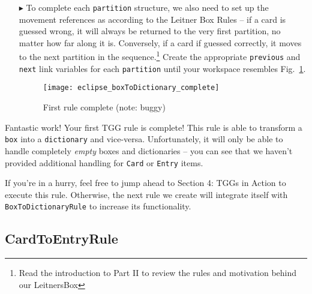\begin{itemize}
\item[$\blacktriangleright$] To complete each \texttt{partition} structure, we also need to set up the movement references as according to the Leitner Box
Rules -- if a card is guessed wrong, it will always be returned to the very first partition, no matter how far along it is. Conversely, if a card if guessed
correctly, it moves to the next partition in the sequence.\footnote{Read the introduction to Part II to review the rules and motivation behind our LeitnersBox}
Create the appropriate \texttt{previous} and \texttt{next} link variables for each \texttt{partition} until your workspace resembles
Fig.~\ref{fig:allReferences}.

\begin{figure}[htbp]
\begin{center}
  \texttt{[image: eclipse\_boxToDictionary\_complete]}
  \caption{First rule complete (note: buggy)}
  \label{fig:allReferences}
\end{center}
\end{figure}

\end{itemize}

Fantastic work! Your first TGG rule is complete! This rule is able to transform a \texttt{box} into a \texttt{dictionary} and vice-versa. Unfortunately, it will
only be able to handle completely \emph{empty} boxes and dictionaries -- you can see that we haven't provided additional handling for \texttt{Card} or
\texttt{Entry} items.

If you're in a hurry, feel free to jump ahead to Section 4: TGGs in Action to execute this rule. Otherwise, the next rule we create will integrate itself with
\texttt{BoxToDictionaryRule} to increase its functionality. 


\newpage
\subsection{CardToEntryRule}

